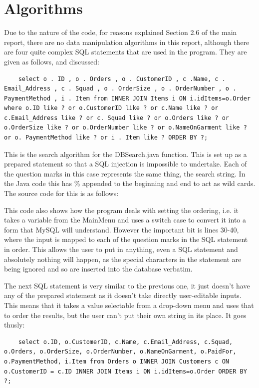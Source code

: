 \documentclass[11pt]{report}
\begin{document}
\section{Algorithms}
	Due to the nature of the code, for reasons explained Section 2.6 of the main report, there are no data manipulation algorithms in this report, although there are four quite complex SQL statements that are used in the program. They  are given as follows, and discussed:
\begin{lstlisting}
	select o . ID , o . Orders , o . CustomerID , c .Name, c . Email_Address , c . Squad , o . OrderSize , o . OrderNumber , o . PaymentMethod , i . Item from INNER JOIN Items i ON i.idItems=o.Order where o.ID like ? or o.CustomerID like ? or c.Name like ? or c.Email_Address like ? or c. Squad like ? or o.Orders like ? or o.OrderSize like ? or o.OrderNumber like ? or o.NameOnGarment like ? or o. PaymentMethod like ? or i . Item like ? ORDER BY ?;	
\end{lstlisting}
This is the search algorithm for the DBSearch.java function. This is set up as a prepared statement so that a SQL injection is impossible to undertake. Each of the question marks in this case represents the same thing, the search string. In the Java code this has \% appended to the beginning and end to act as wild cards. The source code for this is as follows: 

This code also shows how the program deals with setting the ordering, i.e. it takes a variable from the MainMenu and uses a switch case to convert it into a form that MySQL will understand. However the important bit is lines 30-40, where the input is mapped to each of the question marks in the SQL statement in order. This allows the user to put in anything, even a SQL statement and absolutely nothing will happen, as the special characters in the statement are being ignored and so are inserted into the database verbatim. 
\par
	The next SQL statement is very similar to the previous one, it just doesn't have any of the prepared statement as it doesn't take directly user-editable inputs. This means that it takes a value selectable from a drop-down menu and uses that to order the results, but the user can't put their own string in its place. It goes thusly:
\begin{lstlisting}
	select o.ID, o.CustomerID, c.Name, c.Email_Address, c.Squad, o.Orders, o.OrderSize, o.OrderNumber, o.NameOnGarment, o.PaidFor, o.PaymentMethod, i.Item from Orders o INNER JOIN Customers c ON o.CustomerID = c.ID INNER JOIN Items i ON i.idItems=o.Order ORDER BY ?;	
\end{lstlisting}
\end{document}
